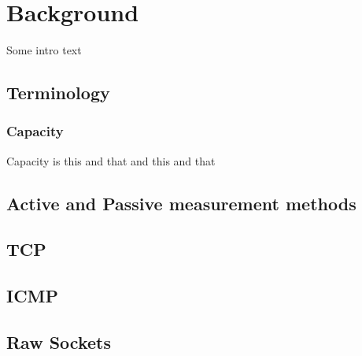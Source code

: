 \chapter{Background}
Some intro text

\section{Terminology}

\subsection*{Capacity}
Capacity is this and that and this and that

\section{Active and Passive measurement methods}

\section{TCP}

\section{ICMP}

\section{Raw Sockets}


